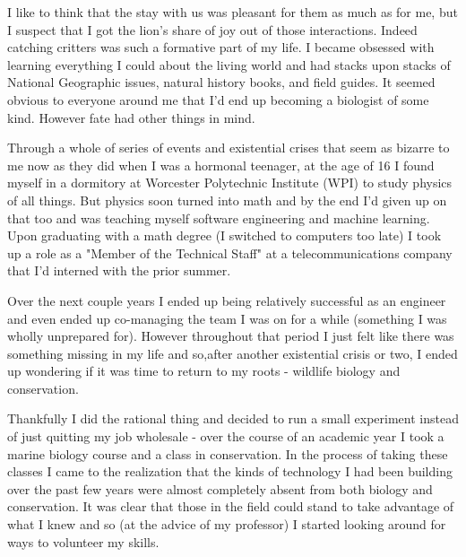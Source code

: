 \documentclass[11pt,a5paper]{book}
\begin{document}
I like to think that the stay with us was pleasant for them as much as for me, but I suspect that I got the lion's share of joy out of those interactions. Indeed catching critters was such a formative part of my life. I became obsessed with learning everything I could about the living world and had stacks upon stacks of National Geographic issues, natural history books, and field guides. It seemed obvious to everyone around me that I'd end up becoming a biologist of some kind. However fate had other things in mind.
\newline

Through a whole of series of events and existential crises that seem as bizarre to me now as they did when I was a hormonal teenager, at the age of 16 I found myself in a dormitory at Worcester Polytechnic Institute (WPI) to study physics of all things. But physics soon turned into math and by the end I'd given up on that too and was teaching myself software engineering and machine learning. Upon graduating with a math degree (I switched to computers too late) I took up a role as a "Member of the Technical Staff" at a telecommunications company that I'd interned with the prior summer.
\newline

Over the next couple years I ended up being relatively successful as an engineer and even ended up co-managing the team I was on for a while (something I was wholly unprepared for). However throughout that period I just felt like there was something missing in my life and so,after another existential crisis or two, I ended up wondering if it was time to return to my roots - wildlife biology and conservation. 
\newline

Thankfully I did the rational thing and decided to run a small experiment instead of just quitting my job wholesale - over the course of an academic year I took a marine biology course and a class in conservation. In the process of taking these classes I came to the realization that the kinds of technology I had been building over the past few years were almost completely absent from both biology and conservation. It was clear that those in the field could stand to take advantage of what I knew and so (at the advice of my professor) I started looking around for ways to volunteer my skills.
\newline
\end{document}
